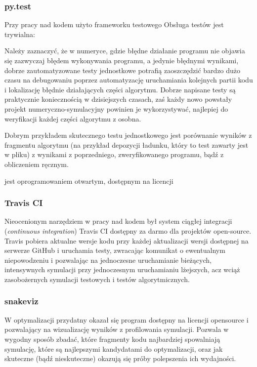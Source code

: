     \subsubsection{py.test}
    Przy pracy nad kodem użyto frameworku testowego 
     Obsługa testów jest trywialna:


    Należy zaznaczyć, że w numeryce, gdzie błędne działanie programu nie
    objawia się zazwyczaj błędem wykonywania programu, a jedynie błędnymi
    wynikami, dobrze zautomatyzowane testy jednostkowe potrafią zaoszczędzić
    bardzo dużo czasu na debugowaniu poprzez automatyzację uruchamiania
    kolejnych partii kodu i lokalizację błędnie działających części algorytmu.
    Dobrze napisane testy są praktycznie koniecznością w dzisiejszych czasach,
    zaś każdy nowo powstały projekt numeryczno-symulacyjny powinien je
    wykorzystywać, najlepiej do weryfikacji każdej części algorytmu z osobna.

    Dobrym przykładem skutecznego testu jednostkowego jest porównanie wyników z
    fragmentu algorytmu (na przykład depozycji ładunku, który to test zawarty
    jest w pliku) 
     z wynikami z poprzedniego, zweryfikowanego
    programu, bądź z obliczeniem ręcznym.

     jest oprogramowaniem otwartym, dostępnym na licencji

    \subsubsection{Travis CI}
    Nieocenionym narzędziem w pracy nad kodem był system ciągłej integracji
    (\emph{continuous integration}) Travis CI  dostępny za
    darmo dla projektów open-source. Travis pobiera aktualne wersje kodu przy
    każdej aktualizacji wersji dostępnej na serwerze GitHub i uruchamia testy,
    zwracając komunikat o ewentualnym niepowodzeniu i pozwalając na jednoczesne
    uruchamianie bieżących, intensywnych symulacji przy jednoczesnym
    uruchamianiu lżejszych, acz wciąż zasobożernych 
    symulacji testowych i testów algorytmicznych.

    \subsubsection{snakeviz}

    W optymalizacji przydatny okazał się program  dostępny na
    licencji opensource i pozwalający na wizualizację wyników z profilowania
    symulacji. Pozwala w wygodny sposób zbadać, które fragmenty kodu najbardziej
    spowalniają symulację, które są najlepszymi kandydatami do optymalizacji, oraz
    jak skuteczne (bądź nieskuteczne) okazują się próby polepszenia ich wydajności.
     
